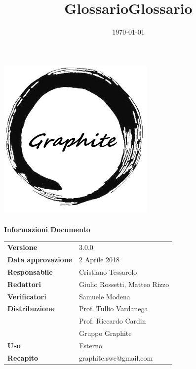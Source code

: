 \documentclass[openany,12pt,a4paper]{report}
\title{Glossario}
\author{}
\date{\today}
\title {Glossario}
\newcommand{\versione}{3.0.0}
\begin{document}
		
	\makeatletter
	\begin{titlepage}
		\setlength{\headsep}{0pt}  
		\begin{center}			
			\includegraphics[width=0.5\linewidth]{Logo.png}\\[1em]
			{\huge \bfseries  \@title }\\[10ex]
			\textbf{\Large Informazioni Documento} \\[2em]
			\bgroup
			\def\arraystretch{1.5}
			\begin{tabular}{l|l}
				\textbf{Versione} & \versione{} \\
				\textbf{Data approvazione} & 2 Aprile 2018 \\
				\textbf{Responsabile} & Cristiano Tessarolo \\
				\textbf{Redattori} & Giulio Rossetti, Matteo Rizzo \\
				\textbf{Verificatori} & Samuele Modena \\
				\textbf{Distribuzione} & Prof. Tullio Vardanega \\
				& Prof. Riccardo Cardin \\
				& Gruppo Graphite \\
				\textbf{Uso} & Esterno \\
				\textbf{Recapito} & graphite.swe@gmail.com \\
			\end{tabular}
			\egroup
		\end{center}
	\end{titlepage}
	\makeatother
	
	\thispagestyle{empty}
	\newpage
	
	
	\tableofcontents
	\printglossary[style=glossaryStyle, nonumberlist]
\end{document}

